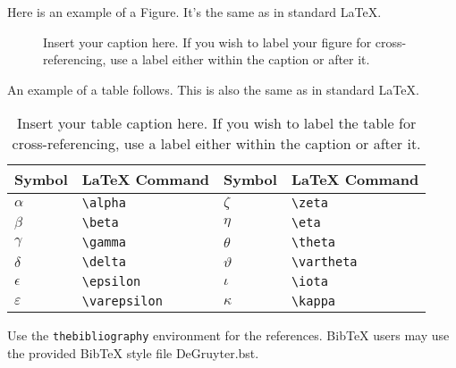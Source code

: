 \documentclass[letterpaper,12pt]{article}
\begin{document}
Here is an example of a Figure. It's the same as in standard LaTeX.

\begin{figure}[!h]
\centering
\caption{Insert your caption here. If you wish to label your figure for
  cross-referencing, use a label either within the caption or after it.}
\label{fig1}
\end{figure}

An example of a table follows. This is also the same as in standard LaTeX.

\begin{table}[!h]
\centering
\caption{Insert your table caption here. If you wish to label the table for
  cross-referencing, use a label either within the caption or after it.}
\begin{tabular}{llll}
\hline
Symbol        & LaTeX Command      & Symbol      & LaTeX Command \\
\hline
$\alpha$      & \verb+\alpha+      & $\zeta$     & \verb+\zeta+ \\
$\beta$       & \verb+\beta+       & $\eta$      & \verb+\eta+ \\
$\gamma$      & \verb+\gamma+      & $\theta$    & \verb+\theta+ \\
$\delta$      & \verb+\delta+      & $\vartheta$ & \verb+\vartheta+ \\
$\epsilon$    & \verb+\epsilon+    & $\iota$     & \verb+\iota+ \\
$\varepsilon$ & \verb+\varepsilon+ & $\kappa$    & \verb+\kappa+ \\
\hline
\end{tabular}
\end{table}

Use the \verb+thebibliography+ environment for the references.  BibTeX users may
use the provided BibTeX style file DeGruyter.bst.



\end{document}
